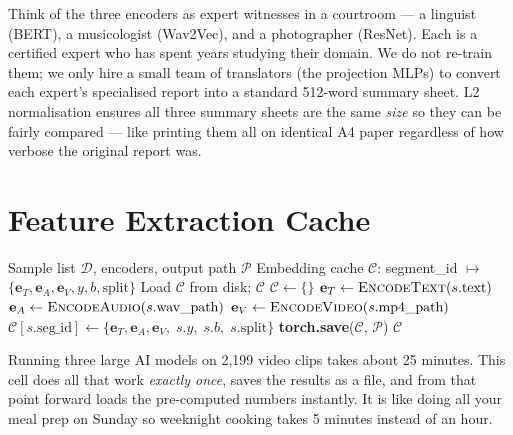 \documentclass[12pt,a4paper]{article}
\theoremstyle{definition}
\begin{document}
\begin{laymanbox}
Think of the three encoders as expert witnesses in a courtroom — a linguist (BERT), a musicologist (Wav2Vec), and a photographer (ResNet). Each is a certified expert who has spent years studying their domain. We do not re-train them; we only hire a small team of translators (the projection MLPs) to convert each expert's specialised report into a standard 512-word summary sheet. L2 normalisation ensures all three summary sheets are the same \emph{size} so they can be fairly compared — like printing them all on identical A4 paper regardless of how verbose the original report was.
\end{laymanbox}

\section{Feature Extraction Cache}

\begin{algorithm}[H]
\caption{\textsc{ExtractAndCacheEmbeddings} — One-Time Feature Extraction}
\label{alg:cache}
\begin{algorithmic}[1]
\Require Sample list $\mathcal{D}$, encoders, output path $\mathcal{P}$
\Ensure Embedding cache $\mathcal{C}$: segment\_id $\mapsto$ $\{\mathbf{e}_T, \mathbf{e}_A, \mathbf{e}_V, y, b, \text{split}\}$
  \State Load $\mathcal{C}$ from disk; \Return $\mathcal{C}$ 
\EndIf
\State $\mathcal{C} \gets \{\}$
  \State $\mathbf{e}_T \gets \textsc{EncodeText}(s.\text{text})$
  \State $\mathbf{e}_A \gets \textsc{EncodeAudio}(s.\text{wav\_path})$
  \State $\mathbf{e}_V \gets \textsc{EncodeVideo}(s.\text{mp4\_path})$
  \State $\mathcal{C}[s.\text{seg\_id}] \gets \{\mathbf{e}_T, \mathbf{e}_A, \mathbf{e}_V,\; s.y,\; s.b,\; s.\text{split}\}$
\EndFor
\State \textbf{torch.save}($\mathcal{C}$, $\mathcal{P}$)
\State \Return $\mathcal{C}$
\end{algorithmic}
\end{algorithm}

\begin{laymanbox}
Running three large AI models on 2,199 video clips takes about 25 minutes. This cell does all that work \emph{exactly once}, saves the results as a file, and from that point forward loads the pre-computed numbers instantly. It is like doing all your meal prep on Sunday so weeknight cooking takes 5 minutes instead of an hour.
\end{laymanbox}
\end{document}
